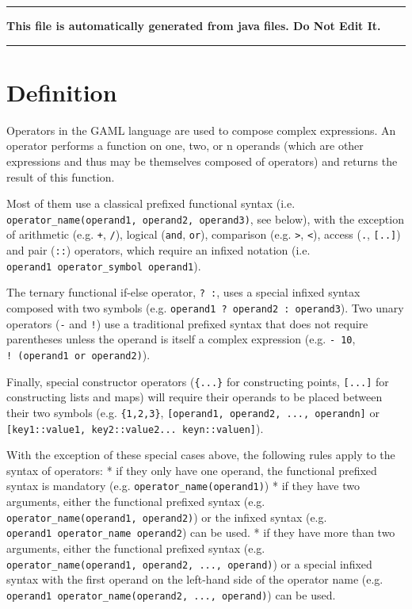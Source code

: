 \documentclass[]{book}
\theoremstyle{definition}
\theoremstyle{definition}
\theoremstyle{definition}
\theoremstyle{remark}
\begin{document}
\begin{center}\rule{0.5\linewidth}{\linethickness}\end{center}

\textbf{This file is automatically generated from java files. Do Not
Edit It.}

\begin{center}\rule{0.5\linewidth}{\linethickness}\end{center}

\section{Definition}\label{definition-4}

Operators in the GAML language are used to compose complex expressions.
An operator performs a function on one, two, or n operands (which are
other expressions and thus may be themselves composed of operators) and
returns the result of this function.

Most of them use a classical prefixed functional syntax (i.e.
\texttt{operator\_name(operand1,\ operand2,\ operand3)}, see below),
with the exception of arithmetic (e.g. \texttt{+}, \texttt{/}), logical
(\texttt{and}, \texttt{or}), comparison (e.g. \texttt{\textgreater{}},
\texttt{\textless{}}), access (\texttt{.}, \texttt{{[}..{]}}) and pair
(\texttt{::}) operators, which require an infixed notation (i.e.
\texttt{operand1\ operator\_symbol\ operand1}).

The ternary functional if-else operator, \texttt{?\ :}, uses a special
infixed syntax composed with two symbols (e.g.
\texttt{operand1\ ?\ operand2\ :\ operand3}). Two unary operators
(\texttt{-} and \texttt{!}) use a traditional prefixed syntax that does
not require parentheses unless the operand is itself a complex
expression (e.g. \texttt{-\ 10}, \texttt{!\ (operand1\ or\ operand2)}).

Finally, special constructor operators (\texttt{\{...\}} for
constructing points, \texttt{{[}...{]}} for constructing lists and maps)
will require their operands to be placed between their two symbols (e.g.
\texttt{\{1,2,3\}}, \texttt{{[}operand1,\ operand2,\ ...,\ operandn{]}}
or \texttt{{[}key1::value1,\ key2::value2...\ keyn::valuen{]}}).

With the exception of these special cases above, the following rules
apply to the syntax of operators: * if they only have one operand, the
functional prefixed syntax is mandatory (e.g.
\texttt{operator\_name(operand1)}) * if they have two arguments, either
the functional prefixed syntax (e.g.
\texttt{operator\_name(operand1,\ operand2)}) or the infixed syntax
(e.g. \texttt{operand1\ operator\_name\ operand2}) can be used. * if
they have more than two arguments, either the functional prefixed syntax
(e.g. \texttt{operator\_name(operand1,\ operand2,\ ...,\ operand)}) or a
special infixed syntax with the first operand on the left-hand side of
the operator name (e.g.
\texttt{operand1\ operator\_name(operand2,\ ...,\ operand)}) can be
used.
\end{document}
